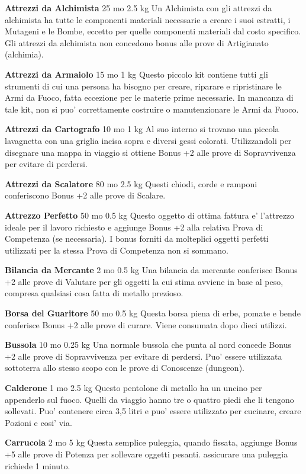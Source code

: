\documentclass[a4paper,11pt,twoside,openany]{dndbook}
\begin{document}
{\textbf{Attrezzi da Alchimista} 25 mo 2.5 kg Un Alchimista con gli attrezzi da alchimista ha tutte le componenti materiali necessarie a creare i suoi estratti, i Mutageni e le Bombe, eccetto per quelle componenti materiali dal costo specifico. Gli attrezzi da alchimista non concedono bonus alle prove di Artigianato (alchimia).

\textbf{Attrezzi da Armaiolo} 15 mo 1 kg Questo piccolo kit contiene tutti gli strumenti di cui una persona ha bisogno per creare, riparare e ripristinare le Armi da Fuoco, fatta eccezione per le materie prime necessarie. In mancanza di tale kit, non si puo' correttamente costruire o manutenzionare le Armi da Fuoco.

\textbf{Attrezzi da Cartografo} 10 mo 1 kg Al suo interno si trovano una piccola lavagnetta con una griglia incisa sopra e diversi gessi colorati. Utilizzandoli per disegnare una mappa in viaggio si ottiene Bonus +2 alle prove di Sopravvivenza per evitare di perdersi.

\textbf{Attrezzi da Scalatore} 80 mo 2.5 kg Questi chiodi, corde e ramponi conferiscono Bonus +2 alle prove di Scalare.

\textbf{Attrezzo Perfetto} 50 mo 0.5 kg Questo oggetto di ottima fattura e' l'attrezzo ideale per il lavoro richiesto e aggiunge Bonus +2 alla relativa Prova di Competenza (se necessaria). I bonus forniti da molteplici oggetti perfetti utilizzati per la stessa Prova di Competenza non si sommano.

\textbf{Bilancia da Mercante} 2 mo 0.5 kg Una bilancia da mercante conferisce Bonus +2 alle prove di Valutare per gli oggetti la cui stima avviene in base al peso, compresa qualsiasi cosa fatta di metallo prezioso.

\textbf{Borsa del Guaritore} 50 mo 0.5 kg Questa borsa piena di erbe, pomate e bende conferisce Bonus +2 alle prove di curare. Viene consumata dopo dieci utilizzi.

\textbf{Bussola} 10 mo 0.25 kg Una normale bussola che punta al nord concede Bonus +2 alle prove di Sopravvivenza per evitare di perdersi. Puo' essere utilizzata sottoterra allo stesso scopo con le prove di Conoscenze (dungeon).

\textbf{Calderone} 1 mo 2.5 kg Questo pentolone di metallo ha un uncino per appenderlo sul fuoco. Quelli da viaggio hanno tre o quattro piedi che li tengono sollevati. Puo' contenere circa 3,5 litri e puo' essere utilizzato per cucinare, creare Pozioni e cosi' via.

\textbf{Carrucola} 2 mo 5 kg Questa semplice puleggia, quando fissata, aggiunge Bonus +5 alle prove di Potenza per sollevare oggetti pesanti. assicurare una puleggia richiede 1 minuto.

}
\end{document}
